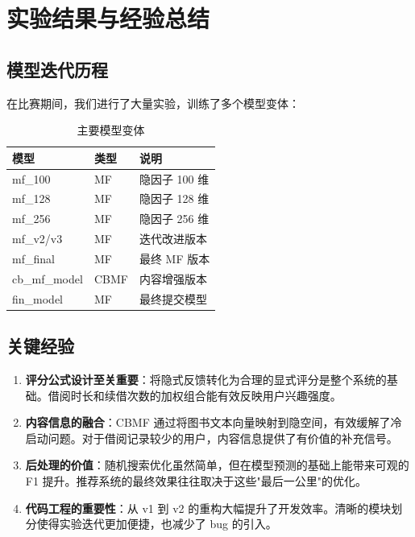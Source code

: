 \documentclass[12pt,a4paper]{article}
\begin{document}
\section{实验结果与经验总结}

\subsection{模型迭代历程}

在比赛期间，我们进行了大量实验，训练了多个模型变体：

\begin{table}[H]
\centering
\caption{主要模型变体}
\begin{tabular}{lll}
\toprule
\textbf{模型} & \textbf{类型} & \textbf{说明} \\
\midrule
mf\_100 & MF & 隐因子 100 维 \\
mf\_128 & MF & 隐因子 128 维 \\
mf\_256 & MF & 隐因子 256 维 \\
mf\_v2/v3 & MF & 迭代改进版本 \\
mf\_final & MF & 最终 MF 版本 \\
cb\_mf\_model & CBMF & 内容增强版本 \\
fin\_model & MF & 最终提交模型 \\
\bottomrule
\end{tabular}
\end{table}

\subsection{关键经验}

\begin{enumerate}[leftmargin=2em]
    \item \textbf{评分公式设计至关重要}：将隐式反馈转化为合理的显式评分是整个系统的基础。借阅时长和续借次数的加权组合能有效反映用户兴趣强度。

    \item \textbf{内容信息的融合}：CBMF 通过将图书文本向量映射到隐空间，有效缓解了冷启动问题。对于借阅记录较少的用户，内容信息提供了有价值的补充信号。

    \item \textbf{后处理的价值}：随机搜索优化虽然简单，但在模型预测的基础上能带来可观的 F1 提升。推荐系统的最终效果往往取决于这些"最后一公里"的优化。

    \item \textbf{代码工程的重要性}：从 v1 到 v2 的重构大幅提升了开发效率。清晰的模块划分使得实验迭代更加便捷，也减少了 bug 的引入。
\end{enumerate}
\end{document}
